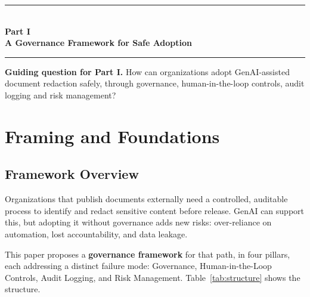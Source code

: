 \documentclass[12pt,a4paper]{article}
\begin{document}
\newpage

\tableofcontents
\newpage

\begin{center}
{\color{accentdark}\rule{\textwidth}{1.2pt}}\\[6pt]
{\Huge\bfseries\color{accentdark} Part I}\\[8pt]
{\LARGE\bfseries\color{accentdark!85!black} A Governance Framework for Safe Adoption}\\[8pt]
{\color{accentdark}\rule{\textwidth}{1.2pt}}
\end{center}
\vspace{8pt}

\begin{quotebox}
\textbf{Guiding question for Part I.} How can organizations adopt GenAI-assisted document redaction safely, through governance, human-in-the-loop controls, audit logging and risk management?
\end{quotebox}

\section{Framing and Foundations}
\label{sec:foundations}

\subsection{Framework Overview}

Organizations that publish documents externally need a controlled, auditable process to identify and redact sensitive content before release. GenAI can support this, but adopting it without governance adds new risks: over-reliance on automation, lost accountability, and data leakage.

This paper proposes a \textbf{governance framework} for that path, in four pillars, each addressing a distinct failure mode: Governance, Human-in-the-Loop Controls, Audit Logging, and Risk Management. Table~\ref{tab:structure} shows the structure.
\end{document}
